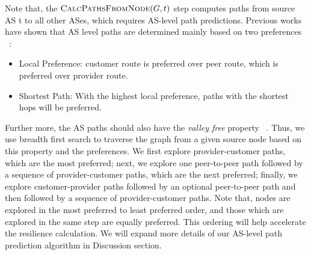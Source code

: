Note that, the $\Call{CalcPathsFromNode}{G,t}$ step computes paths from source AS t to all other ASes, which requires AS-level path predictions. Previous works have shown that AS level paths are determined mainly based on two preferences ~\cite{gao2001stable}:

\begin{itemize}
\item Local Preference: customer route is preferred over peer route, which is preferred over provider route. 
\item Shortest Path: With the highest local preference, paths with the shortest hops will be preferred. 
\end{itemize}

Further more, the AS paths should also have the \emph{valley free} property ~\cite{gao2001inferring}. Thus, we use breadth first search to traverse the graph from a given source node based on this property and the preferences. We first explore provider-customer paths, which are the most preferred; next, we explore one peer-to-peer path followed by a sequence of provider-customer paths, which are the next preferred; finally, we explore customer-provider paths followed by an optional peer-to-peer path and then followed by a sequence of provider-customer paths. Note that, nodes are explored in the most preferred to least preferred order, and those which are explored in the same step are equally preferred. This ordering will help accelerate the resilience calculation. We will expand more details of our AS-level path prediction algorithm in Discussion section. 



